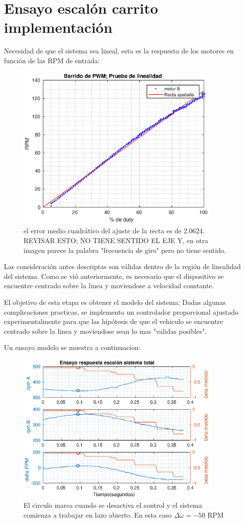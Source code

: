 \documentclass[10pt,conference,a4paper,onecolumn]{article}%
\begin{document}
\section{Ensayo escalón carrito implementación}

Necesidad de que el sistema sea lineal, esta es la respuesta de los motores en función de las RPM de entrada:

\begin{figure}[h]
\centering
\includegraphics[width=10cm]{./imagenes/prueba_linealidad}
\caption{el error medio cuadrático del ajuste de la recta es de 2.0624. REVISAR ESTO; NO TIENE SENTIDO EL EJE Y, en otra imagen parece la palabra "frecuencia de giro" pero no tiene sentido.}
\label{fig:prueba_linealidad}
\end{figure}

Las consideración antes descriptas son válidas dentro de la región de linealidad del sistema. Como se vió anteriormente, es necesario que el dispositivo se encuentre centrado sobre la linea y moviendose a velocidad constante. 

El objetivo de esta etapa es obtener el modelo del sistema; Dadas algunas complicaciones practicas, se implemento un controlador proporcional ajustado experimentalmente para que las hipótesis de que el vehiculo se encuentre centrado sobre la linea y moviendose sean lo mas "validas posibles". 

Un ensayo modelo se muestra a continuacion:
\begin{figure}[h]
\centering
\includegraphics[width=10cm]{./imagenes/resp_escalon_sys_total}
\caption{El circulo marca cuando se desactiva el control y el sistema comienza a trabajar en lazo abierto. En esta caso $\Delta \omega=-50 $ RPM}
\label{fig:ens_esc_syst}
\end{figure}
\end{document}
